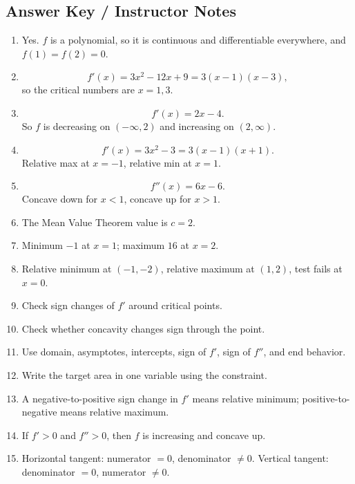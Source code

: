 \documentclass[11pt]{article}
\begin{document}
\newpage
\subsection{Answer Key / Instructor Notes}

\begin{enumerate}
    \item Yes. $f$ is a polynomial, so it is continuous and differentiable everywhere, and $f(1)=f(2)=0$.

    \item
    \[
    f'(x)=3x^2-12x+9=3(x-1)(x-3),
    \]
    so the critical numbers are $x=1,3$.

    \item
    \[
    f'(x)=2x-4.
    \]
    So $f$ is decreasing on $(-\infty,2)$ and increasing on $(2,\infty)$.

    \item
    \[
    f'(x)=3x^2-3=3(x-1)(x+1).
    \]
    Relative max at $x=-1$, relative min at $x=1$.

    \item
    \[
    f''(x)=6x-6.
    \]
    Concave down for $x<1$, concave up for $x>1$.

    \item The Mean Value Theorem value is $c=2$.

    \item Minimum $-1$ at $x=1$; maximum $16$ at $x=2$.

    \item Relative minimum at $(-1,-2)$, relative maximum at $(1,2)$, test fails at $x=0$.

    \item Check sign changes of $f'$ around critical points.

    \item Check whether concavity changes sign through the point.

    \item Use domain, asymptotes, intercepts, sign of $f'$, sign of $f''$, and end behavior.

    \item Write the target area in one variable using the constraint.

    \item A negative-to-positive sign change in $f'$ means relative minimum; positive-to-negative means relative maximum.

    \item If $f'>0$ and $f''>0$, then $f$ is increasing and concave up.

    \item Horizontal tangent: numerator $=0$, denominator $\neq 0$. Vertical tangent: denominator $=0$, numerator $\neq 0$.
\end{enumerate}
\end{document}
